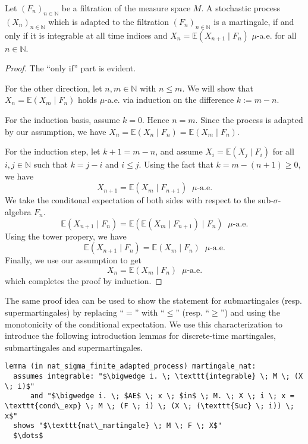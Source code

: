\begin{lemma}
	Let $(F_n)_{n \in \mathbb{N}}$ be a filtration of the measure space $M$. A stochastic process $(X_n)_{n \in \mathbb{N}}$ which is adapted to the filtration $(F_n)_{n \in \mathbb{N}}$ is a martingale, if and only if it is integrable at all time indices and $X_n = \mathbb{E}(X_{n + 1} \;\vert\; F_n)$ $\mu$-a.e. for all $n \in \mathbb{N}$.
\end{lemma}
\begin{proof}
	The ``only if'' part is evident.
	
	For the other direction, let $n, m \in \mathbb{N}$ with $n \le m$. We will show that $X_n = \mathbb{E}(X_m \;\vert\; F_n)$ holds $\mu$-a.e. via induction on the difference $k := m - n$. 
	
	For the induction basis, assume $k = 0$. Hence $n = m$. Since the process is adapted by our assumption, we have $X_n = \mathbb{E}(X_n \;\vert\; F_n) = \mathbb{E}(X_m \;\vert\; F_n)$.
	
	For the induction step, let $k + 1 = m - n$, and assume $X_i = \mathbb{E}(X_j \;\vert\; F_i)$ for all $i, j \in \mathbb{N}$ such that $k = j - i$ and $i \le j$. Using the fact that $k = m - (n + 1) \ge 0$, we have
	\[
		X_{n + 1} = \mathbb{E}(X_m \;\vert\; F_{n + 1}) \;\;\mu\textrm{-a.e.}
	\]
	We take the conditonal expectation of both sides with respect to the sub-$\sigma$-algebra $F_n$.
	\[
		\mathbb{E}(X_{n + 1} \;\vert\; F_n) =  \mathbb{E}(\mathbb{E}(X_m \;\vert\; F_{n + 1}) \;\vert\; F_n) \;\;\mu\textrm{-a.e.}
	\]
	Using the tower propery, we have
	\[
		\mathbb{E}(X_{n + 1} \;\vert\; F_n) =  \mathbb{E}(X_m \;\vert\; F_n) \;\;\mu\textrm{-a.e.}
	\]
	Finally, we use our assumption to get
	\[
		X_n =  \mathbb{E}(X_m \;\vert\; F_n) \;\;\mu\textrm{-a.e.}
	\]	
	which completes the proof by induction.
\end{proof}

The same proof idea can be used to show the statement for submartingales (resp. supermartingales) by replacing ``$=$'' with ``$\le$'' (resp. ``$\ge$'') and using the monotonicity of the conditional expectation. We use this characterization to introduce the following introduction lemmas for discrete-time martingales, submartingales and supermartingales.

\begin{isalemma}
{\small
\begin{lstlisting}[style=isabelle]
lemma (in nat_sigma_finite_adapted_process) martingale_nat:
  assumes integrable: "$\bigwedge i. \; \texttt{integrable} \; M \; (X \; i)$" 
      and "$\bigwedge i. \; $AE$ \; x \; $in$ \; M. \; X \; i \; x = \texttt{cond\_exp} \; M \; (F \; i) \; (X \; (\texttt{Suc} \; i)) \; x$" 
  shows "$\texttt{nat\_martingale} \; M \; F \; X$"
  $\dots$
\end{lstlisting}
}
\end{isalemma}

